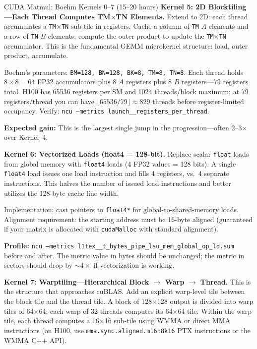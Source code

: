 \begin{exercise}{CUDA Matmul: Boehm Kernels 0--7 (15--20 hours)}
\medskip
\textbf{Kernel 5: 2D Blocktiling---Each Thread Computes TM$\times$TN Elements.}
Extend to 2D: each thread accumulates a \texttt{TM}$\times$\texttt{TN} sub-tile in registers. Cache a column of \texttt{TM} $A$ elements and a row of \texttt{TN} $B$ elements; compute the outer product to update the \texttt{TM}$\times$\texttt{TN} accumulator. This is the fundamental GEMM microkernel structure: load, outer product, accumulate.

Boehm's parameters: \texttt{BM=128, BN=128, BK=8, TM=8, TN=8}. Each thread holds $8 \times 8 = 64$ FP32 accumulators plus 8 $A$ registers plus 8 $B$ registers---79 registers total. H100 has 65536 registers per SM and 1024 threads/block maximum; at 79 registers/thread you can have $\lfloor 65536 / 79 \rfloor \approx 829$ threads before register-limited occupancy. Verify: \texttt{ncu --metrics launch\_\_registers\_per\_thread}.

\textbf{Expected gain:} This is the largest single jump in the progression---often 2--3$\times$ over Kernel~4.

\medskip
\textbf{Kernel 6: Vectorized Loads (float4 = 128-bit).}
Replace scalar \texttt{float} loads from global memory with \texttt{float4} loads (4 FP32 values = 128 bits). A single \texttt{float4} load issues one load instruction and fills 4 registers, vs.\ 4 separate instructions. This halves the number of issued load instructions and better utilizes the 128-byte cache line width.

Implementation: cast pointers to \texttt{float4*} for global-to-shared-memory loads. Alignment requirement: the starting address must be 16-byte aligned (guaranteed if your matrix is allocated with \texttt{cudaMalloc} with standard alignment).

\textbf{Profile:} \texttt{ncu --metrics l1tex\_\_t\_bytes\_pipe\_lsu\_mem\_global\_op\_ld.sum} before and after. The metric value in bytes should be unchanged; the metric in sectors should drop by $\sim 4\times$ if vectorization is working.

\medskip
\textbf{Kernel 7: Warptiling---Hierarchical Block $\to$ Warp $\to$ Thread.}
This is the structure that approaches cuBLAS. Add an explicit warp-level tile between the block tile and the thread tile. A block of 128$\times$128 output is divided into warp tiles of 64$\times$64; each warp of 32 threads computes its 64$\times$64 tile. Within the warp tile, each thread computes a 16$\times$16 sub-tile using WMMA or direct MMA instructions (on H100, use \texttt{mma.sync.aligned.m16n8k16} PTX instructions or the WMMA C++ API).


\end{exercise}
